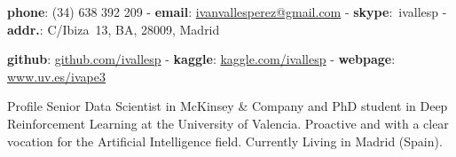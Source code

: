\documentclass{resume} %
\begin{document}
  

\vspace{-20pt}

\begin{Center}
        {\textbf{phone}: (34) 638 392 209 - 
        \textbf{email}: \href{mailto:ivanvallesperez@gmail.com}{ivanvallesperez@gmail.com} -
         \textbf{skype}:\ ivallesp -
         \textbf{addr.}: C/Ibiza\ 13, BA, 28009, Madrid }
\end{Center}

\vspace{-6pt}

\begin{Center}
        \textbf{github}: \href{https://www.github.com/ivallesp}{github.com/ivallesp}   -  \textbf{kaggle}: \href{https://www.kaggle.com/ivallesp}{kaggle.com/ivallesp}  -  \textbf{webpage}: \href{https://www.uv.es/~ivape3}{www.uv.es/ivape3}
\end{Center}

\vspace{-5pt}

  
      

\begin{rSection}{Profile}
Senior Data Scientist in McKinsey \& Company and PhD student in Deep Reinforcement Learning at the University of Valencia. Proactive and with a clear vocation for the Artificial Intelligence field. Currently Living in Madrid (Spain).
\end{rSection}


\end{document}
